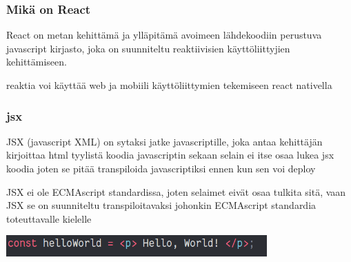 \documentclass[11pt,a4paper,titlepage,oneside]{article}
\begin{document}
\subsubsection{Mikä on React}



React on metan kehittämä ja ylläpitämä avoimeen lähdekoodiin perustuva javascript kirjasto, joka on suunniteltu reaktiivisien käyttöliittyjien kehittämiseen.

reaktia voi käyttää web ja mobiili käyttöliittymien tekemiseen react nativella
\medskip








\subsubsection{jsx}





JSX (javascript XML) on sytaksi jatke javascriptille, joka antaa kehittäjän kirjoittaa html tyylistä koodia javascriptin sekaan
selain ei itse osaa lukea jsx koodia joten se pitää transpiloida javascriptiksi ennen kun sen voi deploy



JSX ei ole ECMAscript standardissa, joten selaimet eivät osaa tulkita sitä, vaan JSX se on suunniteltu transpiloitavaksi johonkin ECMAscript standardia toteuttavalle kielelle
\medskip

\bigskip
\includegraphics[width=10cm]{src/public/oppar/pure_jsx_example.png}
\end{document}
